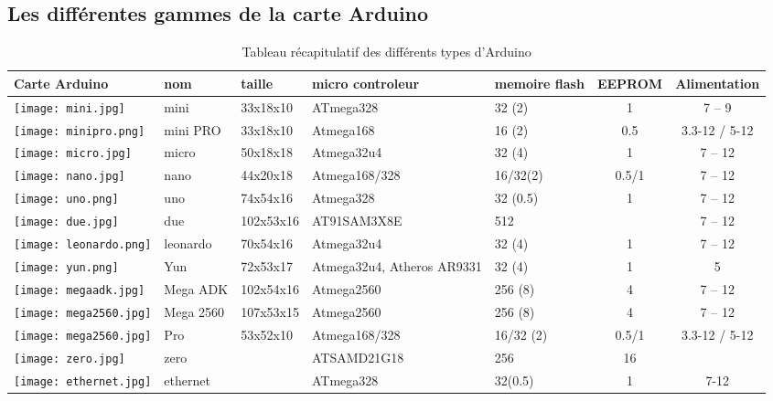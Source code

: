 \documentclass[12pt, openany]{report}
\begin{document}
\subsection {Les différentes gammes de la carte Arduino}
\newpage
\begin{table}[!h]


{\large }
\begin{tabular}{|p{}|p{}|p{2cm}|p{3cm}|p{2cm}|c|c||}
\hline Carte Arduino & nom  & taille & micro controleur &memoire flash  & EEPROM & Alimentation

 \\
\hline  \texttt{[image: mini.jpg]}& mini & 33x18x10   & ATmega328   & 32 (2) & 1  &7 – 9    \\
\hline  \texttt{[image: minipro.png]}& mini PRO&  33x18x10
& Atmega168 & 16 (2) & 0.5 &
3.3-12 / 5-12   \\
\hline  \texttt{[image: micro.jpg]} & micro & 50x18x18 & Atmega32u4
& 32 (4) & 1 & 7 – 12 \\
\hline  \texttt{[image: nano.jpg]} & nano & 44x20x18 & Atmega168/328 & 16/32(2) &  0.5/1 & 7 – 12 \\
\hline  \texttt{[image: uno.png]} & uno & 74x54x16 & Atmega328 & 32 (0.5) & 1
& 7 – 12   \\
\hline  \texttt{[image: due.jpg]} & due & 102x53x16 & AT91SAM3X8E & 512 &  &
7 – 12  \\
\hline  \texttt{[image: leonardo.png]} & leonardo & 70x54x16 & Atmega32u4 & 32 (4)&
1 & 7 – 12 \\
\hline  \texttt{[image: yun.png]}  & Yun &  72x53x17 &
Atmega32u4,
 Atheros
  AR9331  &
32 (4) &
1 &
5  \\
\hline  \texttt{[image: megaadk.jpg]}& Mega ADK & 102x54x16 &
Atmega2560 &
256 (8) &
4 &
7 – 12  \\
\hline  \texttt{[image: mega2560.jpg]} & Mega 2560 &
107x53x15 &
Atmega2560 &
256 (8) &
4 &
7 – 12  \\

\hline  \texttt{[image: mega2560.jpg]} &  Pro &
53x52x10 &
Atmega168/328 &
16/32 (2) &
0.5/1  &
3.3-12 / 5-12    \\
\hline  \texttt{[image: zero.jpg]}& zero & &
ATSAMD21G18 &
256 &
16   \\
\hline  \texttt{[image: ethernet.jpg]}& ethernet & &
ATmega328 &
32(0.5) &
1 &
7-12   \\
\hline
\end{tabular}
\newline

\caption{Tableau récapitulatif des différents types d'Arduino}
\end{table}         		          	
	
\end{document}
